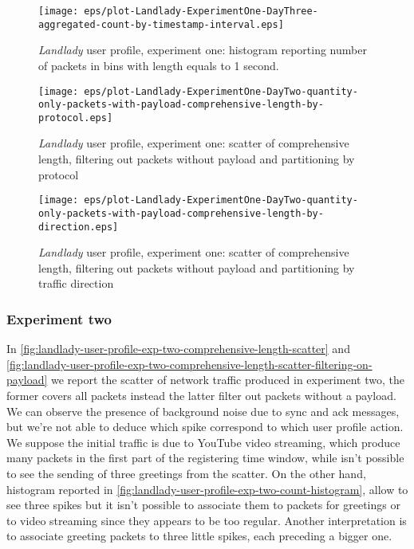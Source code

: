 \documentclass[10pt,a4paper]{article}
\begin{document}
    \begin{figure}
      \centering
      \texttt{[image: eps/plot-Landlady-ExperimentOne-DayThree-aggregated-count-by-timestamp-interval.eps]}
      \caption{\emph{Landlady} user profile, experiment one: histogram
        reporting number of packets in bins with length equals to 1
        second.}
      \label{fig:landlady-user-profile-exp-one-count-histogram}
    \end{figure}

    \begin{figure}
      \centering
      \texttt{[image: eps/plot-Landlady-ExperimentOne-DayTwo-quantity-only-packets-with-payload-comprehensive-length-by-protocol.eps]}
      \caption{\emph{Landlady} user profile, experiment one: scatter
        of comprehensive length, filtering out packets without payload
        and partitioning by protocol}
      \label{fig:landlady-user-profile-comprehensive-length-by-protocol}
    \end{figure}


    \begin{figure}
      \centering
      \texttt{[image: eps/plot-Landlady-ExperimentOne-DayTwo-quantity-only-packets-with-payload-comprehensive-length-by-direction.eps]}
      \caption{\emph{Landlady} user profile, experiment one: scatter
        of comprehensive length, filtering out packets without payload
        and partitioning by traffic direction}
      \label{fig:landlady-user-profile-comprehensive-length-by-direction}
    \end{figure}



    \subsubsection*{Experiment two}
    In
    \autoref{fig:landlady-user-profile-exp-two-comprehensive-length-scatter}
    and
    \autoref{fig:landlady-user-profile-exp-two-comprehensive-length-scatter-filtering-on-payload}
    we report the scatter of network traffic produced in experiment
    two, the former covers all packets instead the latter filter out
    packets without a payload. We can observe the presence of
    background noise due to sync and ack messages, but we're not able
    to deduce which spike correspond to which user profile action.  We
    suppose the initial traffic is due to YouTube video streaming,
    which produce many packets in the first part of the registering
    time window, while isn't possible to see the sending of three
    greetings from the scatter. On the other hand, histogram reported
    in \autoref{fig:landlady-user-profile-exp-two-count-histogram},
    allow to see three spikes but it isn't possible to associate them
    to packets for greetings or to video streaming since they appears
    to be too regular. Another interpretation is to associate greeting
    packets to three little spikes, each preceding a bigger one.
\end{document}
